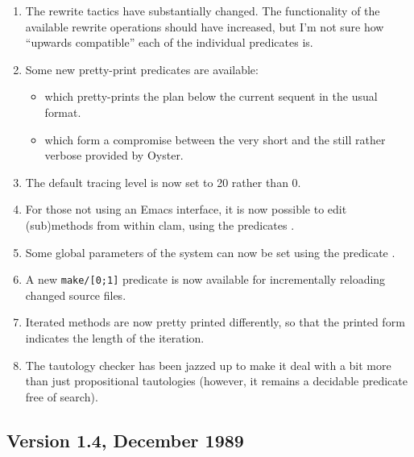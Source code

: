 \begin{enumerate}
\item
The rewrite tactics have substantially changed. The functionality
of the available rewrite operations should have increased, but I'm not
sure how ``upwards compatible'' each of the individual predicates is.
\item
Some new pretty-print predicates are available:
  \begin{itemize}
  \item
   which pretty-prints the plan below the current
    sequent in the usual format.
  \item
   which form a compromise between the very short
   and the still rather verbose 
  provided by Oyster.
 \end{itemize}
\item
The default tracing level is now set to 20 rather than 0.
\item
For those not using an Emacs interface, it is now possible to edit
(sub)methods from within clam, using the predicates .
\item
Some global parameters of the system can now be set using the
predicate .
\item
A new {\tt make/[0;1]} predicate is now available for incrementally
reloading changed source files. 
\item
Iterated methods are now pretty printed differently, so that
the printed form indicates the length of the iteration.
\item
The tautology checker has been jazzed up to make it deal with a bit
more than just propositional tautologies (however, it remains a
decidable predicate free of search).
\end{enumerate}

\subsection {Version 1.4, December 1989}


